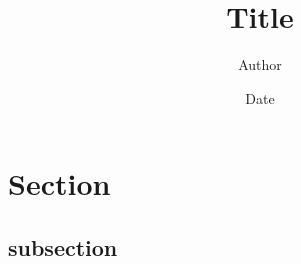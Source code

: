 \documentclass{article}
\title{Title}
\author{Author}
\date{Date}
\begin{document}
\maketitle

\section{Section}
\subsection{subsection}
\end{document}
